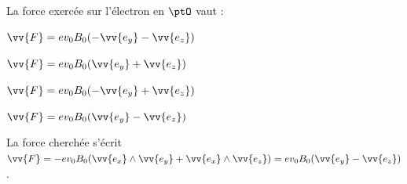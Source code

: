                                 \initialisationPartieDroite %
\begin{center}
\end{center}
                               \finalisationDuPartageDePage %

\debutEntrainement


\minusMedskip

\begin{enonce}
La force exercée sur l'électron en $\ptO$ vaut :
\begin{listeQCM2Colonnes}
		\item $\vv{F}=e v_0 B_0 (-\vv{e_y} - \vv{e_z})$
		\item $\vv{F}=e v_0 B_0 (\vv{e_y} + \vv{e_z})$
		\item $\vv{F}=e v_0 B_0 (-\vv{e_y} + \vv{e_z})$
		\item $\vv{F}=e v_0 B_0 (\vv{e_y} - \vv{e_z})$
	\end{listeQCM2Colonnes}
\end{enonce}

\reponse{$\reponseD{}$}

\begin{corrige} 
La force cherchée s'écrit $\vv{F}=-ev_{0}B_{0} ( \vv{e_x} \wedge \vv{e_y} + \vv{e_x} \wedge \vv{e_z} ) =ev_{0}B_{0} (\vv{e_y} -\vv{e_z} )$.
\end{corrige}

